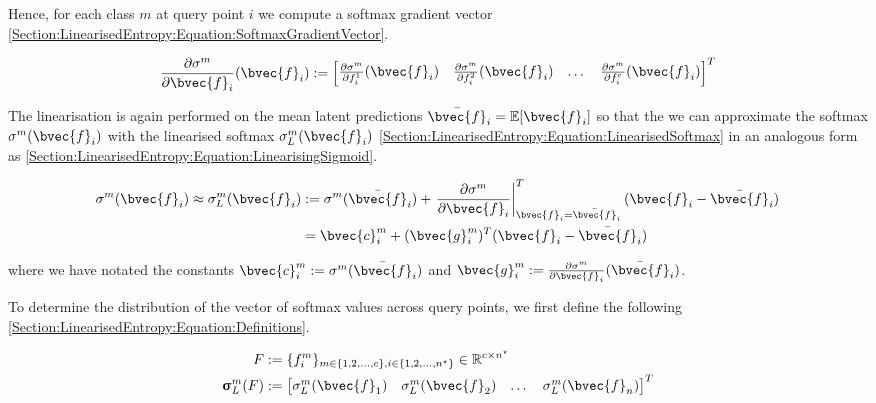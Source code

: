 \documentclass{article}
\renewcommand{\vec}[1]{\boldsymbol{#1}}
\begin{document}
			Hence, for each class $m$ at query point $i$ we compute a softmax gradient vector \eqref{Section:LinearisedEntropy:Equation:SoftmaxGradientVector}.
			
			\begin{equation}
				\frac{\partial \sigma^{m}}{\partial \bvec{f}_{i}}(\bvec{f}_{i}) := \begin{bmatrix} \frac{\partial \sigma^{m}}{\partial f^{1}_{i}}(\bvec{f}_{i}) & \frac{\partial \sigma^{m}}{\partial f^{2}_{i}}(\bvec{f}_{i}) & \dots & \frac{\partial \sigma^{m}}{\partial f^{c}_{i}}(\bvec{f}_{i}) \end{bmatrix}^{T}
			\label{Section:LinearisedEntropy:Equation:SoftmaxGradientVector}
			\end{equation}
			
			The linearisation is again performed on the mean latent predictions $\bar{\bvec{f}}_{i} = \mathbb{E}[\bvec{f}_{i}]$ so that the we can approximate the softmax $\sigma^{m}(\bvec{f}_{i})$ with the linearised softmax $\sigma^{m}_{L}(\bvec{f}_{i})$ \eqref{Section:LinearisedEntropy:Equation:LinearisedSoftmax} in an analogous form as \eqref{Section:LinearisedEntropy:Equation:LinearisingSigmoid}.
			
			\begin{equation}
				\begin{aligned}
					\sigma^{m}(\bvec{f}_{i}) \approx \sigma^{m}_{L}(\bvec{f}_{i}) & := \sigma^{m}(\bar{\bvec{f}}_{i}) + \left. \frac{\partial \sigma^{m}}{\partial \bvec{f}_{i}} \right|^{T}_{\bvec{f}_{i} = \bar{\bvec{f}}_{i}} (\bvec{f}_{i} - \bar{\bvec{f}}_{i}) \\
					& = \bvec{c}^{m}_{i} + (\bvec{g}^{m}_{i})^{T} (\bvec{f}_{i} - \bar{\bvec{f}}_{i})
				\end{aligned}
			\label{Section:LinearisedEntropy:Equation:LinearisedSoftmax}
			\end{equation}
			
			where we have notated the constants $\bvec{c}^{m}_{i} := \sigma^{m}(\bar{\bvec{f}}_{i})$ and $\bvec{g}^{m}_{i} := \frac{\partial \sigma^{m}}{\partial \bvec{f}_{i}}(\bar{\bvec{f}}_{i})$.
			
			To determine the distribution of the vector of softmax values across query points, we first define the following \eqref{Section:LinearisedEntropy:Equation:Definitions}.
			
			\begin{equation}
				\begin{aligned}
					F &:= \{f^{m}_{i}\}_{m \in \{1, 2, \dots, c\}, i \in \{1, 2, \dots, n^{\star}\}} \in \mathbb{R}^{c \times n^{\star}} \\
					\vec{\upsigma}^{m}_{L}(F) &:= \begin{bmatrix} \sigma^{m}_{L}(\bvec{f}_{1}) & \sigma^{m}_{L}(\bvec{f}_{2}) & \dots & \sigma^{m}_{L}(\bvec{f}_{n}) \end{bmatrix}^{T}
				\end{aligned}
			\label{Section:LinearisedEntropy:Equation:Definitions}
			\end{equation}
						
\end{document}
